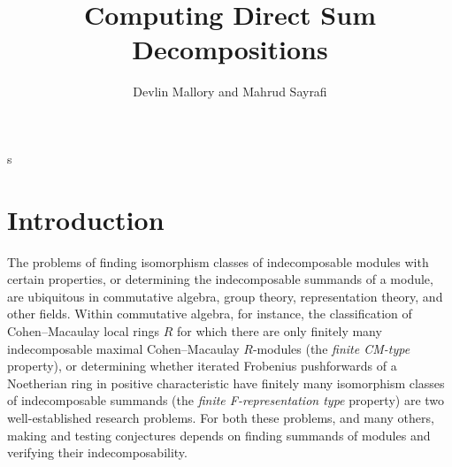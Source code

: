 s\documentclass{article}
\title{Computing Direct Sum Decompositions}
\author{Devlin Mallory and Mahrud Sayrafi}
\numberwithin{equation}{section}
\theoremstyle{theorem}
\numberwithin{thm}{section}
\theoremstyle{definition}
\begin{document}
\maketitle





\section{Introduction}


The problems of finding isomorphism classes of indecomposable modules with certain properties, or determining the indecomposable summands of a module, are ubiquitous in commutative algebra, group theory, representation theory, and other fields. Within commutative algebra, for instance, the classification of Cohen--Macaulay local rings $R$ for which there are only finitely many indecomposable maximal Cohen--Macaulay $R$-modules (the \emph{finite CM-type} property), or determining whether iterated Frobenius pushforwards of a Noetherian ring in positive characteristic have finitely many isomorphism classes of indecomposable summands (the \emph{finite F-representation type} property) are two well-established research problems. For both these problems, and many others, making and testing conjectures depends on finding summands of modules and verifying their indecomposability.
\end{document}

